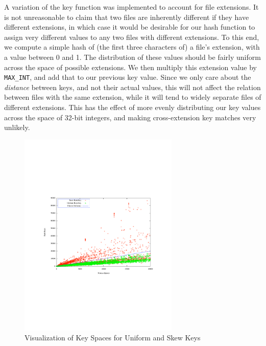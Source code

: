 \documentclass[10pt, twocolumn]{article}
\begin{document}
A variation of the key function was implemented to account for file extensions.  It is not unreasonable to claim that two files are inherently different if they have different extensions,  in which case it would be desirable for our hash function to assign very different values to any two files with different extensions.  To this end, we compute a simple hash of (the first three characters of) a file's extension, with a value between 0 and 1.  The distribution of these values should be fairly uniform across the space of possible extensions.  We then multiply this extension value by {\tt MAX\_INT}, and add that to our previous key value.  Since we only care about the {\it distance} between keys, and not their actual values, this will not affect the relation between files with the same extension, while it will tend to widely separate files of different extensions.  This has the effect of more evenly distributing our key values across the space of 32-bit integers, and making cross-extension key matches very unlikely.

 \begin{figure}[h] 
 \centering
\includegraphics[width= 3in]{scatter_circles.pdf}
\caption{Visualization of Key Spaces for Uniform and Skew Keys}
\label{scatterPoster} 
\end{figure}   
\end{document}
